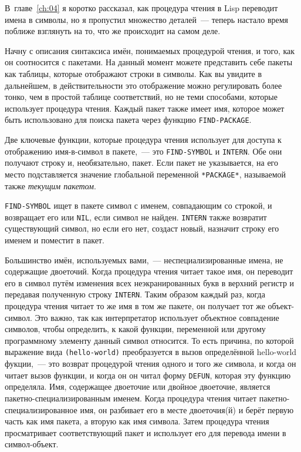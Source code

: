 В~главе~\ref{ch:04} я коротко рассказал, как процедура чтения в Lisp переводит имена в символы,
но я пропустил множество деталей~--- теперь настало время поближе взглянуть на то, что же
происходит на самом деле.

Начну с описания синтаксиса имён, понимаемых процедурой чтения, и того, как он соотносится с
пакетами.  На данный момент можете представить себе пакеты как таблицы, которые
отображают строки в символы. Как вы увидите в дальнейшем, в действительности это
отображение можно регулировать более тонко, чем в простой таблице соответствий, но не теми
способами, которые использует процедура чтения. Каждый пакет также имеет имя, которое может
быть использовано для поиска пакета через функцию \lstinline{FIND-PACKAGE}.

Две ключевые функции, которые процедура чтения использует для доступа к отображению
имя-в-символ в пакете,~--- это \lstinline{FIND-SYMBOL} и \lstinline{INTERN}. Обе они получают строку и,
необязательно, пакет.  Если пакет не указывается, на его место подставляется значение
глобальной переменной \lstinline{*PACKAGE*}, называемой также \textit{текущим пакетом}.

\lstinline{FIND-SYMBOL} ищет в пакете символ с именем, совпадающим со строкой, и возвращает его
или \lstinline{NIL}, если символ не найден. \lstinline{INTERN} также возвратит существующий символ,
но если его нет, создаст новый, назначит строку его именем и поместит в пакет.

Большинство имён, используемых вами,~--- неспециализированные имена, не содержащие
двоеточий. Когда процедура чтения читает такое имя, он переводит его в символ путём изменения
всех неэкранированных букв в верхний регистр и передавая полученную строку \lstinline{INTERN}.
Таким образом каждый раз, когда процедура чтения читает то же имя в том же пакете, он получает
тот же объект-символ. Это важно, так как интерпретатор использует объектное совпадение
символов, чтобы определить, к какой функции, переменной или другому программному элементу
данный символ относится. То есть причина, по которой выражение вида \lstinline{(hello-world)}
преобразуется в вызов определённой hello-world фукции,~--- это возврат процедурой чтения одного и
того же символа, и когда он читает вызов функции, и когда он он читал форму \lstinline{DEFUN},
которая эту функцию определяла.  Имя, содержащее двоеточие или двойное двоеточие, является
пакетно-специализированным именем. Когда процедура чтения читает пакетно-специализированное
имя, он разбивает его в месте двоеточия(й) и берёт первую часть как имя пакета, а вторую
как имя символа.  Затем процедура чтения просматривает соответствующий пакет и использует его
для перевода имени в символ-объект.

